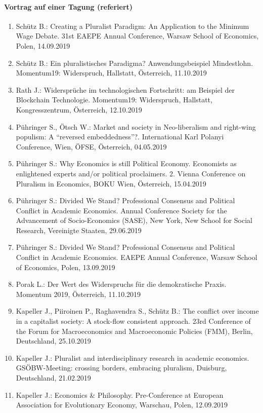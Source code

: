\paragraph{Vortrag auf einer Tagung (referiert)}
\begin{enumerate}
	\item Schütz B.: Creating a Pluralist Paradigm: An Application to the Minimum Wage Debate. 31st EAEPE Annual Conference, Warsaw School of Economics, Polen, 14.09.2019
	\item Schütz B.: Ein pluralistisches Paradigma? Anwendungsbeispiel Mindestlohn. Momentum19: Widerspruch, Hallstatt, Österreich, 11.10.2019
	\item Rath J.: Widersprüche im technologischen Fortschritt: am Beispiel der Blockchain Technologie. Momentum19: Widerspruch, Hallstatt, Kongresszentrum, Österreich, 12.10.2019
	\item Pühringer S., Ötsch W.: Market and society in Neo-liberalism and right-wing populism: A “reversed embeddedness”?. International Karl Polanyi Conference, Wien, ÖFSE, Österreich, 04.05.2019
	\item Pühringer S.: Why Economics is still Political Economy. Economists as enlightened experts and/or political proclaimers. 2. Vienna Conference on Pluralism in Economics, BOKU Wien, Österreich, 15.04.2019
	\item Pühringer S.: Divided We Stand? Professional Consensus and Political Conflict in Academic Economics. Annual Conference Society for the Advancement of Socio-Economics (SASE), New York, New School for Social Research, Vereinigte Staaten, 29.06.2019
	\item Pühringer S.: Divided We Stand? Professional Consensus and Political Conflict in Academic Economics. EAEPE Annual Conference, Warsaw School of Economics, Polen, 13.09.2019
	\item Porak L.: Der Wert des Widerspruchs für die demokratische Praxis. Momentum 2019, Österreich, 11.10.2019
	\item Kapeller J., Piiroinen P., Raghavendra S., Schütz B.: The conflict over income in a capitalist society: A stock-flow consistent approach. 23rd Conference of the Forum for Macroeconomics and Macroeconomic Policies (FMM), Berlin, Deutschland, 25.10.2019
	\item Kapeller J.: Pluralist and interdisciplinary research in academic economics. GSÖBW-Meeting: \glqq crossing borders, embracing pluralism\grqq{}, Duisburg, Deutschland, 21.02.2019
	\item Kapeller J.: Economics \& Philosophy. Pre-Conference at European Association for Evolutionary Economy, Warschau, Polen, 12.09.2019

\end{enumerate}
